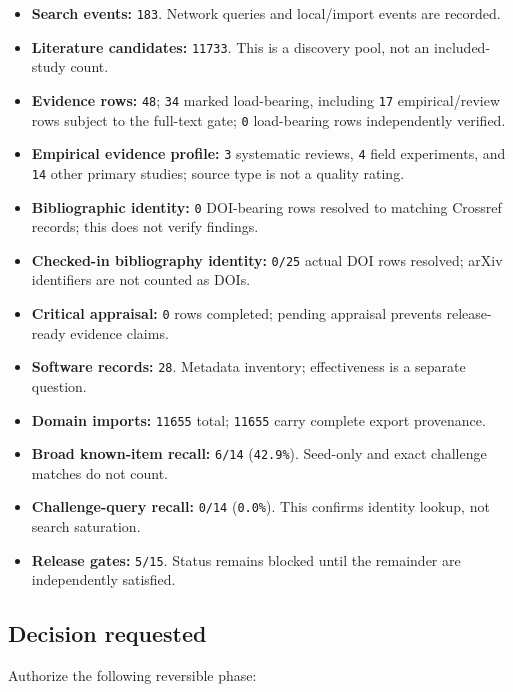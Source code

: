 \documentclass[11pt]{article}
\providecommand{\tightlist}{\setlength{\itemsep}{0pt}\setlength{\parskip}{0pt}}
\begin{document}
\begin{itemize}
\tightlist
\item
  \textbf{Search events:} \texttt{183}. Network queries and local/import events are recorded.
\item
  \textbf{Literature candidates:} \texttt{11733}. This is a discovery pool, not an included-study count.
\item
  \textbf{Evidence rows:} \texttt{48}; \texttt{34} marked load-bearing, including \texttt{17} empirical/review rows subject to the full-text gate; \texttt{0} load-bearing rows independently verified.
\item
  \textbf{Empirical evidence profile:} \texttt{3} systematic reviews, \texttt{4} field experiments, and \texttt{14} other primary studies; source type is not a quality rating.
\item
  \textbf{Bibliographic identity:} \texttt{0} DOI-bearing rows resolved to matching Crossref records; this does not verify findings.
\item
  \textbf{Checked-in bibliography identity:} \texttt{0/25} actual DOI rows resolved; arXiv identifiers are not counted as DOIs.
\item
  \textbf{Critical appraisal:} \texttt{0} rows completed; pending appraisal prevents release-ready evidence claims.
\item
  \textbf{Software records:} \texttt{28}. Metadata inventory; effectiveness is a separate question.
\item
  \textbf{Domain imports:} \texttt{11655} total; \texttt{11655} carry complete export provenance.
\item
  \textbf{Broad known-item recall:} \texttt{6/14} (\texttt{42.9\%}). Seed-only and exact challenge matches do not count.
\item
  \textbf{Challenge-query recall:} \texttt{0/14} (\texttt{0.0\%}). This confirms identity lookup, not search saturation.
\item
  \textbf{Release gates:} \texttt{5/15}. Status remains blocked until the remainder are independently satisfied.
\end{itemize}

\hypertarget{decision-requested}{%
\subsection{Decision requested}\label{decision-requested}}

Authorize the following reversible phase:
\end{document}
